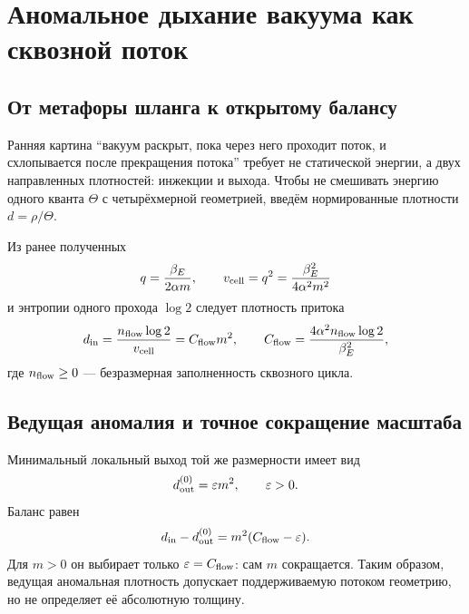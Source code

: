\chapter{Аномальное дыхание вакуума как сквозной поток}
\label{ch:v10-induced-newton-breathing-anomaly}

\section{От метафоры шланга к открытому балансу}

Ранняя картина ``вакуум раскрыт, пока через него проходит поток, и
схлопывается после прекращения потока'' требует не статической энергии, а
двух направленных плотностей: инжекции и выхода. Чтобы не смешивать энергию
одного кванта $\Theta$ с четырёхмерной геометрией, введём нормированные
плотности $d=\rho/\Theta$.

Из ранее полученных
\begin{equation}
 q=\frac{\beta_E}{2\alpha m},
 \qquad
 v_{\rm cell}=q^2
 =\frac{\beta_E^2}{4\alpha^2m^2}
 \label{eq:v10-breathing-cell-volume}
\end{equation}
и энтропии одного прохода $\log2$ следует плотность притока
\begin{equation}
 d_{\rm in}
 =\frac{n_{\rm flow}\log2}{v_{\rm cell}}
 =C_{\rm flow}m^2,
 \qquad
 C_{\rm flow}=\frac{4\alpha^2n_{\rm flow}\log2}{\beta_E^2},
 \label{eq:v10-breathing-inflow}
\end{equation}
где $n_{\rm flow}\geq0$ --- безразмерная заполненность сквозного цикла.

\section{Ведущая аномалия и точное сокращение масштаба}

Минимальный локальный выход той же размерности имеет вид
\begin{equation}
 d_{\rm out}^{(0)}=\varepsilon m^2,
 \qquad \varepsilon>0.
 \label{eq:v10-breathing-leading-output}
\end{equation}
Баланс равен
\begin{equation}
 d_{\rm in}-d_{\rm out}^{(0)}
 =m^2(C_{\rm flow}-\varepsilon).
 \label{eq:v10-breathing-leading-balance}
\end{equation}
Для $m>0$ он выбирает только $\varepsilon=C_{\rm flow}$: сам $m$
сокращается. Таким образом, ведущая аномальная плотность допускает
поддерживаемую потоком геометрию, но не определяет её абсолютную толщину.

